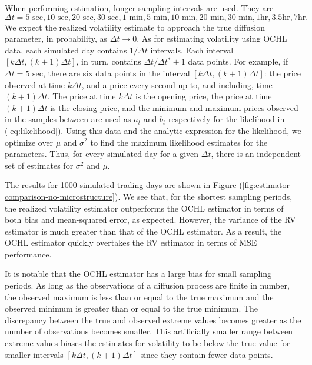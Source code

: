 When performing estimation, longer sampling intervals are used. They are  
\[ \Delta t = 5 \mbox{ sec}, 10 \mbox{ sec}, 20 \mbox{ sec}, 30 \mbox{ sec}, 1 \mbox{ min}, 5  \mbox{ min}, 10 \mbox{ min}, 20 \mbox{ min}, 30 \mbox{ min}, 1 \mbox{hr}, 3.5 \mbox{hr}, 7 \mbox{hr}. \]
We expect the realized volatility estimate to approach the true diffusion parameter, in probability, as $\Delta t \to 0$. As for estimating volatility using OCHL data, each simulated day contains $1/\Delta t$ intervals. Each interval $[k\Delta t, (k+1)\Delta t]$, in turn, contains $\Delta t/\Delta t^* + 1$ data points. For example, if $\Delta t = 5\mbox{ sec}$, there are six data points in the interval $[k\Delta t, (k+1)\Delta t]$: the price observed at time $k \Delta t$, and a price every second up to, and including, time $(k+1) \Delta t$. The price at time $k\Delta t$ is the opening price, the price at time $(k+1)\Delta t$ is the closing price, and the minimum and maximum prices observed in the samples between are used as $a_t$ and $b_t$ respectively for the likelihood in (\ref{eq:likelihood}). Using this data and the analytic expression for the likelihood, we optimize over $\mu$ and $\sigma^2$ to find the maximum likelihood estimates for the parameters. Thus, for every simulated day for a given $\Delta t$, there is an independent set of estimates for $\sigma^2$ and $\mu$. 

The results for 1000 simulated trading days are shown in Figure (\ref{fig:estimator-comparison-no-microstructure}). We see that, for the shortest sampling periods, the realized volatility estimator outperforms the OCHL estimator in terms of both bias and mean-squared error, as expected. However, the variance of the RV estimator is much greater than that of the OCHL estimator. As a result, the OCHL estimator quickly overtakes the RV estimator in terms of MSE performance.

It is notable that the OCHL estimator has a large bias for small sampling periods. As long as the observations of a diffusion process are finite in number, the observed maximum is less than or equal to the true maximum and the observed minimum is greater than or equal to the true minimum. The discrepancy between the true and observed extreme values becomes greater as the number of observations becomes smaller. This artificially smaller range between extreme values biases the estimates for volatility to be below the true value for smaller intervals $[k\Delta t, (k+1)\Delta t]$ since they contain fewer data points. 

